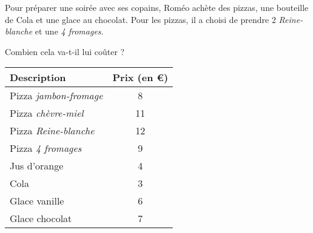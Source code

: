 
Pour préparer une soirée avec ses copains, Roméo achète des pizzas, une bouteille de Cola et une glace au chocolat. Pour les pizzas, il a choisi de prendre 2 \textit{Reine-blanche} et une \textit{4 fromages}.

Combien cela va-t-il lui coûter ?

\medskip
\begin{center}
	\begin{tabular}{|l|c|}
	\hline
	Description & Prix (en €)\\
	\hline
	Pizza  \textit{jambon-fromage} & 8\\
	\hline
	Pizza 	\textit{chèvre-miel} & 11\\
	\hline
	Pizza \textit{Reine-blanche} & 12\\
	\hline
	Pizza \textit{4 fromages} & 9\\
	\hline
	Jus d'orange & 4 \\
	\hline
	Cola & 3\\
	\hline
	Glace vanille & 6\\
	\hline
	Glace chocolat & 7\\
	\hline
	
\end{tabular} 	
\end{center}

